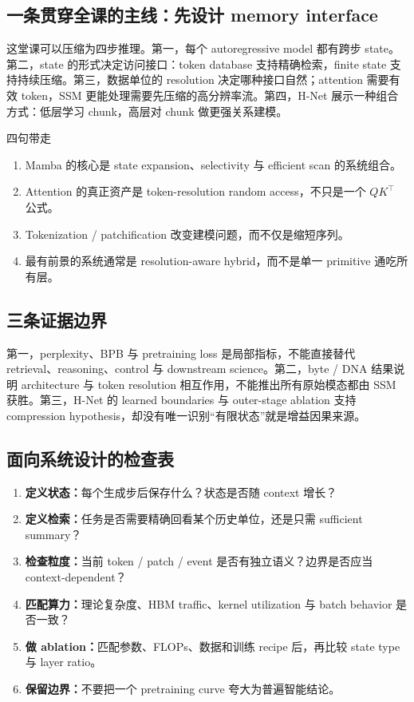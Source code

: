 \documentclass[a4paper]{article}
\begin{document}
\subsection{一条贯穿全课的主线：先设计 memory interface}

这堂课可以压缩为四步推理。第一，每个 autoregressive model 都有跨步 state。第二，state 的形式决定访问接口：token database 支持精确检索，finite state 支持持续压缩。第三，数据单位的 resolution 决定哪种接口自然；attention 需要有效 token，SSM 更能处理需要先压缩的高分辨率流。第四，H-Net 展示一种组合方式：低层学习 chunk，高层对 chunk 做更强关系建模。

\begin{importantbox}{四句带走}
\begin{enumerate}
  \item Mamba 的核心是 state expansion、selectivity 与 efficient scan 的系统组合。
  \item Attention 的真正资产是 token-resolution random access，不只是一个 $QK^\top$ 公式。
  \item Tokenization / patchification 改变建模问题，而不仅是缩短序列。
  \item 最有前景的系统通常是 resolution-aware hybrid，而不是单一 primitive 通吃所有层。
\end{enumerate}
\end{importantbox}

\subsection{三条证据边界}

第一，perplexity、BPB 与 pretraining loss 是局部指标，不能直接替代 retrieval、reasoning、control 与 downstream science。第二，byte / DNA 结果说明 architecture 与 token resolution 相互作用，不能推出所有原始模态都由 SSM 获胜。第三，H-Net 的 learned boundaries 与 outer-stage ablation 支持 compression hypothesis，却没有唯一识别“有限状态”就是增益因果来源。

\subsection{面向系统设计的检查表}

\begin{enumerate}
  \item \textbf{定义状态：}每个生成步后保存什么？状态是否随 context 增长？
  \item \textbf{定义检索：}任务是否需要精确回看某个历史单位，还是只需 sufficient summary？
  \item \textbf{检查粒度：}当前 token / patch / event 是否有独立语义？边界是否应当 context-dependent？
  \item \textbf{匹配算力：}理论复杂度、HBM traffic、kernel utilization 与 batch behavior 是否一致？
  \item \textbf{做 ablation：}匹配参数、FLOPs、数据和训练 recipe 后，再比较 state type 与 layer ratio。
  \item \textbf{保留边界：}不要把一个 pretraining curve 夸大为普遍智能结论。
\end{enumerate}
\end{document}
